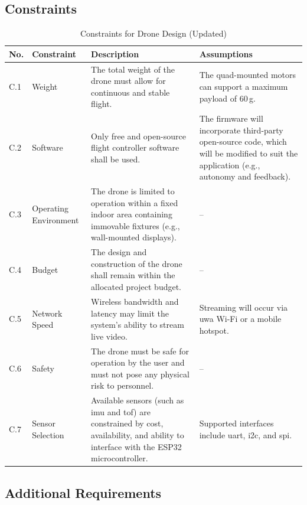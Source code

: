 \subsection{Constraints}
\label{app:constraints}

\begin{table}[H]
\centering
\caption{Constraints for Drone Design (Updated)}
\label{tab:constraints}
\begin{tabular}{|>{\centering\arraybackslash}p{} | >{\centering\arraybackslash}p{} | p{} | p{}|}
\hline
\rowcolor{gray!15}
\textbf{No.} & \textbf{Constraint} & \textbf{Description} & \textbf{Assumptions} \\
\hline
C.1 & Weight & The total weight of the drone must allow for continuous and stable flight. & The quad-mounted motors can support a maximum payload of 60\,g. \\
\hline
C.2 & Software & Only free and open-source flight controller software shall be used. & The firmware will incorporate third-party open-source code, which will be modified to suit the application (e.g., autonomy and feedback). \\
\hline
C.3 & Operating Environment & The drone is limited to operation within a fixed indoor area containing immovable fixtures (e.g., wall-mounted displays). & -- \\
\hline
C.4 & Budget & The design and construction of the drone shall remain within the allocated project budget. & -- \\
\hline
C.5 & Network Speed & Wireless bandwidth and latency may limit the system’s ability to stream live video. & Streaming will occur via \gls{uwa} Wi-Fi or a mobile hotspot. \\
\hline
C.6 & Safety & The drone must be safe for operation by the user and must not pose any physical risk to personnel. & -- \\
\hline
C.7 & Sensor Selection & Available sensors (such as \gls{imu} and \gls{tof}) are constrained by cost, availability, and ability to interface with the ESP32 microcontroller. & Supported interfaces include \gls{uart}, \gls{i2c}, and \gls{spi}. \\
\hline
\end{tabular}
\end{table}

\subsection{Additional Requirements}
\label{app:additional_req}

